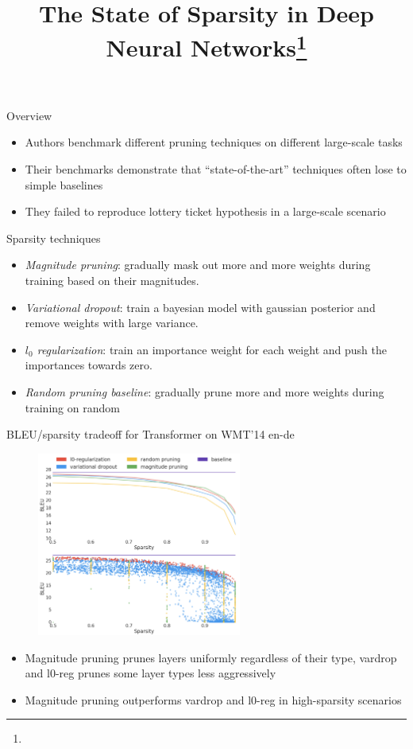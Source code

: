 \documentclass[handout, 10pt]{beamer}
\title{The State of Sparsity in Deep Neural Networks\footnote{\citepaper{StateOfSparsity}}}
\begin{document}
\begin{frame}
    \titlepage
\end{frame}

\begin{frame}{Overview}
    \begin{itemize}
        \item\pause Authors benchmark different pruning techniques on different large-scale tasks
        \item\pause Their benchmarks demonstrate that ``state-of-the-art'' techniques often lose to simple baselines
        \item\pause They failed to reproduce lottery ticket hypothesis in a large-scale scenario
    \end{itemize}
\end{frame}

\begin{frame}{Sparsity techniques}
    \begin{itemize}
        \item\pause \textit{Magnitude pruning}: gradually mask out more and more weights during training based on their magnitudes.
        \item\pause \textit{Variational dropout}: train a bayesian model with gaussian posterior and remove weights with large variance.
        \item\pause \textit{$l_0$ regularization}: train an importance weight for each weight and push the importances towards zero.
        \item\pause \textit{Random pruning baseline}: gradually prune more and more weights during training on random
    \end{itemize}
\end{frame}


\begin{frame}{BLEU/sparsity tradeoff for Transformer on WMT'14 en-de}
\begin{figure}
    \centering
    \includegraphics[width=0.6\textwidth]{images/sparsity-nmt.png}
\end{figure}

    \begin{itemize}
        \item Magnitude pruning prunes layers uniformly regardless of their type, vardrop and l0-reg prunes some layer types less aggressively
        \item Magnitude pruning outperforms vardrop and l0-reg in high-sparsity scenarios
    \end{itemize}
\end{frame}
\end{document}

